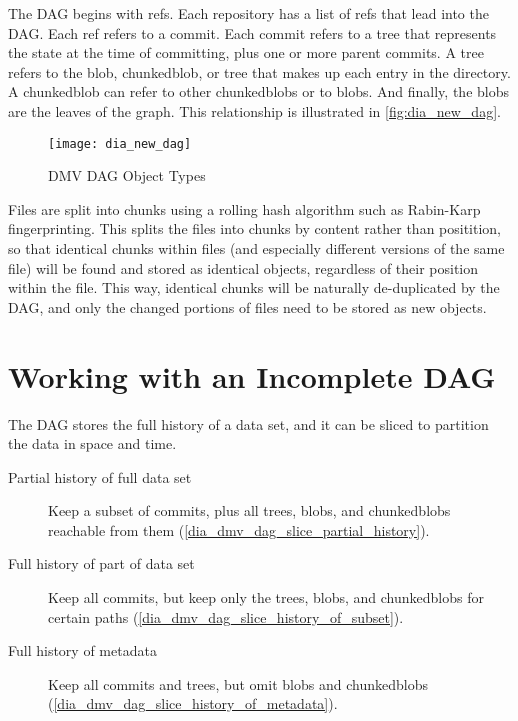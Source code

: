 The DAG begins with refs. Each repository has a list of refs that lead into the
DAG. Each ref refers to a commit. Each commit refers to a tree that represents
the state at the time of committing, plus one or more parent commits. A tree
refers to the \gls{blob}, \gls{chunkedblob}, or tree that makes up each entry in the
directory. A \gls{chunkedblob} can refer to other \glspl{chunkedblob} or to
\glspl{blob}. And finally, the \glspl{blob} are the leaves of the graph. This relationship is
illustrated in \autoref{fig:dia_new_dag}.

\begin{figure}[]
    \centering
        \texttt{[image: dia\_new\_dag]}
    \caption{DMV DAG Object Types}
    \label{fig:dia_new_dag}
\end{figure}


Files are split into chunks using a rolling hash algorithm such as Rabin-Karp
fingerprinting\cite{rabin_karp_fingerprinting}. This splits the files into
chunks by content rather than positition, so that identical chunks within files
(and especially different versions of the same file) will be found and stored as
identical objects, regardless of their position within the file. This way,
identical chunks will be naturally de-duplicated by the DAG, and only the
changed portions of files need to be stored as new objects.

%


\section{Working with an Incomplete DAG}

The DAG stores the full history of a data set, and it can be sliced to partition
the data in space and time.

\begin{description}

    \item[Partial history of full data set] Keep a subset of commits, plus all
        trees, \glspl{blob}, and \glspl{chunkedblob} reachable from them
        (\autoref{dia_dmv_dag_slice_partial_history}).

    \item[Full history of part of data set] Keep all commits, but keep only the
        trees, \glspl{blob}, and \glspl{chunkedblob} for certain paths
        (\autoref{dia_dmv_dag_slice_history_of_subset}).

    \item[Full history of metadata] Keep all commits and trees, but omit \glspl{blob}
        and \glspl{chunkedblob}
        (\autoref{dia_dmv_dag_slice_history_of_metadata}).

\end{description}

